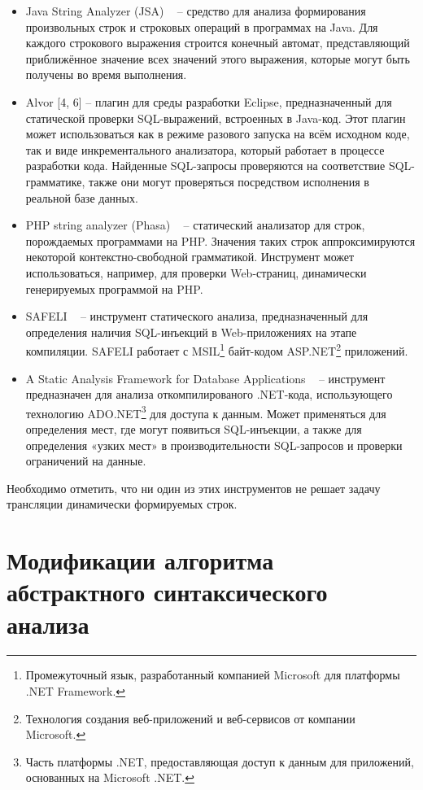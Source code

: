 \documentclass{llncs}
\begin{document}
\begin{itemize}
    \item Java String Analyzer (JSA) ~\cite{JSA} -- средство для анализа формирования произвольных строк и строковых операций в программах на Java. Для каждого строкового выражения строится конечный автомат, представляющий приближённое значение всех значений этого выражения, которые могут быть получены во время выполнения.
    \item Alvor [4, 6] -- плагин для среды разработки Eclipse, предназначенный для статической проверки SQL-выражений, встроенных в Java-код. Этот плагин может использоваться как в режиме разового запуска на всём исходном коде, так и виде инкрементального анализатора, который работает в процессе разработки кода. Найденные SQL-запросы проверяются на соответствие SQL-грамматике, также они могут проверяться посредством исполнения в реальной базе данных.
    \item PHP string analyzer (Phasa) ~\cite{PHPSA} -- статический анализатор для строк, порождаемых программами на PHP. Значения таких строк аппроксимируются некоторой контекстно-свободной грамматикой. Инструмент может  использоваться, например,  для проверки Web-страниц, динамически генерируемых программой на  PHP.
    \item SAFELI ~\cite{SAForInject} -- инструмент статического анализа, предназначенный для определения наличия SQL-инъекций в Web-приложениях на этапе компиляции. SAFELI работает с MSIL\footnote{Промежуточный язык, разработанный компанией Microsoft для платформы .NET Framework.} байт-кодом ASP.NET\footnote{Технология создания веб-приложений и веб-сервисов от компании Microsoft.} приложений.
    \item A Static Analysis Framework for Database Applications ~\cite{StringExpr} -- инструмент предназначен для анализа откомпилированого .NET-кода, использующего технологию ADO.NET\footnote{ Часть платформы .NET, предоставляющая доступ к данным для приложений, основанных на Microsoft .NET.} для доступа к данным. Может применяться для определения мест, где могут появиться SQL-инъекции, а также для определения «узких мест» в производительности SQL-запросов и проверки ограничений на данные.
\end{itemize}

Необходимо отметить, что ни один из этих инструментов   не решает задачу трансляции  динамически формируемых строк.


\section{ Модификации алгоритма абстрактного синтаксического анализа}
\end{document}
